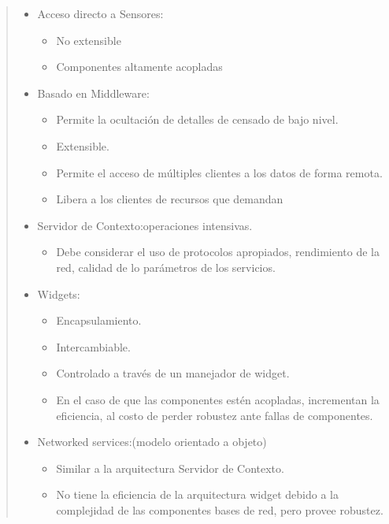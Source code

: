 \begin{quotation} 

\begin{itemize}
\item Acceso directo a Sensores:
	    \begin{itemize}
	    \item No extensible
	    \item Componentes altamente acopladas
	    \end{itemize}

\item Basado en Middleware: 	   
	      \begin{itemize}
	      \item Permite la ocultación de detalles de censado de bajo nivel.
	      \item Extensible.
	      \item Permite el acceso de múltiples clientes a los datos de
forma remota.
	      \item Libera a los clientes de recursos que demandan
	      \end{itemize}

\item Servidor de Contexto:operaciones intensivas.
	    \begin{itemize}
	    \item Debe considerar el uso de protocolos apropiados, rendimiento
de la red, calidad de lo parámetros de los servicios.
	    \end{itemize}

\item Widgets:
	  \begin{itemize}
	  \item Encapsulamiento.
	  \item Intercambiable.
	  \item Controlado a través de un manejador de widget.
	  \item En el caso de que las componentes estén acopladas, incrementan la
	  eficiencia, al costo de perder robustez ante fallas de componentes.
	  
	  \end{itemize}
\item Networked services:(modelo orientado a objeto) 
	\begin{itemize}
	\item Similar a la arquitectura Servidor de Contexto.
	\item No tiene la eficiencia de la arquitectura widget debido a la
    complejidad
	de las componentes bases de red, pero provee robustez.
	\end{itemize}


\end{itemize}
\end{quotation}
